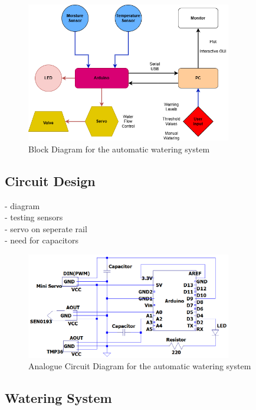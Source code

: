 \documentclass[a4paper,11pt]{article}
\begin{document}
\begin{figure}[H]
    \centering
    \includegraphics[width=0.8\textwidth]{Datalogger Block Diagram - final.png}
    \caption{Block Diagram for the automatic watering system}
    \label{fig:Block_Diagram_for_the_automatic_watering_system}
\end{figure}

\subsection{Circuit Design}
\label{Cicuit_Design}

- diagram\\
- testing sensors\\
- servo on seperate rail\\ 
- need for capacitors

\begin{figure}[H]
    \centering
    \includegraphics[width=0.8\textwidth]{Analogue Circuit Diagram - final.png}
    \caption{Analogue Circuit Diagram for the automatic watering system}
    \label{fig:Analogue_Circuit_Diagram_for_the_automatic_watering_system}
\end{figure}

\subsection{Watering System}
\label{sec:Watering_System}
\end{document}
